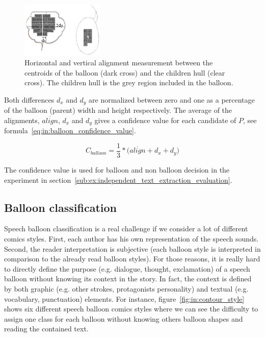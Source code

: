     \begin{figure}[ht]%
      \centering
      \includegraphics[trim= 0px 15px 80px 24px, clip, width=0.35\textwidth]{coaxial_alignment.png}
    \caption[Balloon content alignment measures]{Horizontal and vertical alignment measurement between the centroids of the balloon (dark cross) and the children hull (clear cross). The children hull is the grey region included in the balloon.}
    \label{fig:in:coaxial_alignment}
    \end{figure}

Both differences $d_x$ and $d_y$ are normalized between zero and one as a percentage of the balloon (parent) width and height respectively.
The average of the alignments, $\overline{align}$, $d_x$ and $d_y$ gives a confidence value for each candidate of $P$, see formula~\ref{eq:in:balloon_confidence_value}.

\begin{equation}
	\label{eq:in:balloon_confidence_value}
	C_{balloon} = \frac{1}{3} * \Big( \overline{align} + d_x + d_y \Big)
\end{equation}

The confidence value is used for balloon and non balloon decision in the experiment in section~\ref{sub:ex:independent_text_extraction_evaluation}.



\subsection{Balloon classification} %
\label{sub:in:balloon_classification}

Speech balloon classification is a real challenge if we consider a lot of different comics styles.
First, each author has his own representation of the speech sounds. Second, the reader interpretation is subjective (each balloon style is interpreted in comparison to the already read balloon styles).
For those reasons, it is really hard to directly define the purpose (e.g. dialogue, thought, exclamation) of a speech balloon without knowing its context in the story.
In fact, the context is defined by both graphic (e.g. other strokes, protagonists personality) and textual (e.g. vocabulary, punctuation) elements.
For instance, figure~\ref{fig:in:contour_style} shows six different speech balloon comics styles where we can see the difficulty to assign one class for each balloon without knowing others balloon shapes and reading the contained text.

